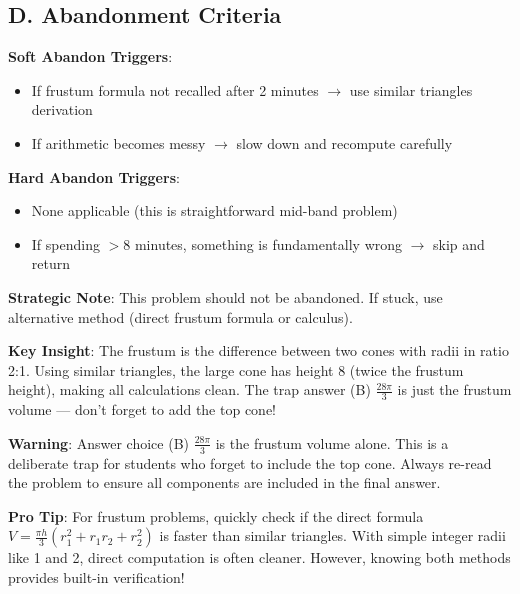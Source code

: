 \documentclass[]{article}
\begin{document}
\begin{competitionbox}
\subsection*{D. Abandonment Criteria}
\textbf{Soft Abandon Triggers}:
\begin{itemize}[leftmargin=*]
    \item If frustum formula not recalled after 2 minutes $\rightarrow$ use similar triangles derivation
    \item If arithmetic becomes messy $\rightarrow$ slow down and recompute carefully
\end{itemize}

\textbf{Hard Abandon Triggers}:
\begin{itemize}[leftmargin=*]
    \item None applicable (this is straightforward mid-band problem)
    \item If spending $>8$ minutes, something is fundamentally wrong $\rightarrow$ skip and return
\end{itemize}

\textbf{Strategic Note}: This problem should not be abandoned. If stuck, use alternative method (direct frustum formula or calculus).
\end{competitionbox}

\begin{keyinsightbox}
\textbf{Key Insight}: The frustum is the difference between two cones with radii in ratio 2:1. Using similar triangles, the large cone has height 8 (twice the frustum height), making all calculations clean. The trap answer (B) $\frac{28\pi}{3}$ is just the frustum volume --- don't forget to add the top cone!
\end{keyinsightbox}

\begin{warningbox}
\textbf{Warning}: Answer choice (B) $\frac{28\pi}{3}$ is the frustum volume alone. This is a deliberate trap for students who forget to include the top cone. Always re-read the problem to ensure all components are included in the final answer.
\end{warningbox}

\begin{tipbox}
\textbf{Pro Tip}: For frustum problems, quickly check if the direct formula $V = \frac{\pi h}{3}(r_1^2 + r_1 r_2 + r_2^2)$ is faster than similar triangles. With simple integer radii like 1 and 2, direct computation is often cleaner. However, knowing both methods provides built-in verification!
\end{tipbox}
\end{document}
